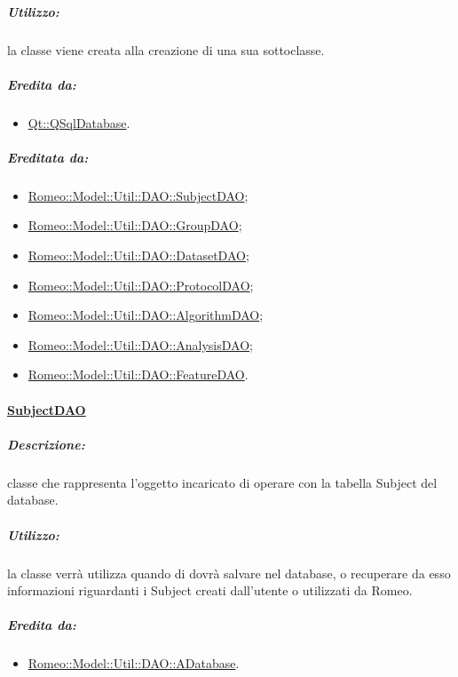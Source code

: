 			\subparagraph{Utilizzo:} la classe viene creata alla creazione di una sua sottoclasse.
			
			\subparagraph{Eredita da:}
				\begin{itemize}
					\item \hyperref[]{Qt::QSqlDatabase}.
				\end{itemize}
			\subparagraph{Ereditata da:}
				\begin{itemize}
					\item \hyperref[dao::subjectdao]{Romeo::Model::Util::DAO::SubjectDAO};
					\item \hyperref[dao::groupdao]{Romeo::Model::Util::DAO::GroupDAO};
					\item \hyperref[dao::datasetdao]{Romeo::Model::Util::DAO::DatasetDAO};
					\item \hyperref[dao::protocoldao]{Romeo::Model::Util::DAO::ProtocolDAO};
					\item \hyperref[dao::algorithmdao]{Romeo::Model::Util::DAO::AlgorithmDAO};
					\item \hyperref[dao::analysisdao]{Romeo::Model::Util::DAO::AnalysisDAO};
					\item \hyperref[dao::featuredao]{Romeo::Model::Util::DAO::FeatureDAO}.
				\end{itemize}
				
		\paragraph{\underline{SubjectDAO}}
		\label{dao::subjectdao}
		
			\subparagraph{Descrizione:} classe che rappresenta l’oggetto incaricato di operare con la tabella Subject\g{} del database.
 			
 			\subparagraph{Utilizzo:} la classe verrà utilizza quando di dovrà salvare nel database, o recuperare da esso informazioni riguardanti i Subject\g{} creati dall'utente o utilizzati da Romeo\g{}.
 			
			\subparagraph{Eredita da:}
				\begin{itemize}
					\item \hyperref[romeo::model::util::dao]{Romeo::Model::Util::DAO::ADatabase}.		
				\end{itemize}
				
